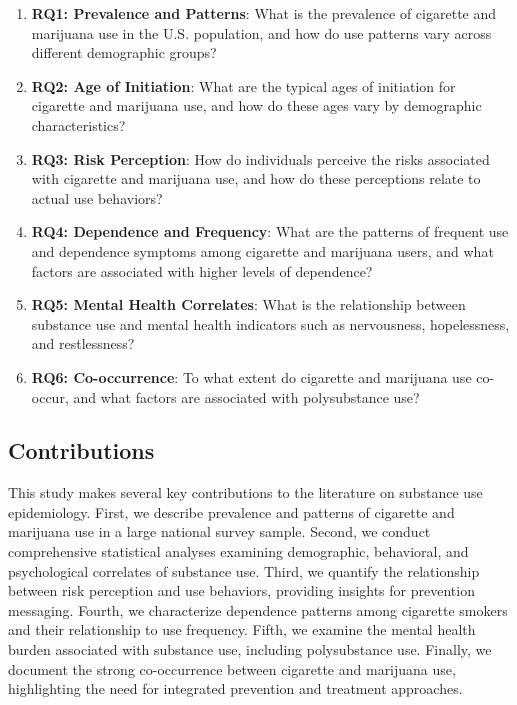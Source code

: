 \documentclass[conference]{IEEEtran}
\begin{document}
\begin{enumerate}
    \item \textbf{RQ1: Prevalence and Patterns}: What is the prevalence of cigarette and marijuana use in the U.S. population, and how do use patterns vary across different demographic groups?
    
    \item \textbf{RQ2: Age of Initiation}: What are the typical ages of initiation for cigarette and marijuana use, and how do these ages vary by demographic characteristics?
    
    \item \textbf{RQ3: Risk Perception}: How do individuals perceive the risks associated with cigarette and marijuana use, and how do these perceptions relate to actual use behaviors?
    
    \item \textbf{RQ4: Dependence and Frequency}: What are the patterns of frequent use and dependence symptoms among cigarette and marijuana users, and what factors are associated with higher levels of dependence?
    
    \item \textbf{RQ5: Mental Health Correlates}: What is the relationship between substance use and mental health indicators such as nervousness, hopelessness, and restlessness?
    
    \item \textbf{RQ6: Co-occurrence}: To what extent do cigarette and marijuana use co-occur, and what factors are associated with polysubstance use?
\end{enumerate}

\subsection{Contributions}

This study makes several key contributions to the literature on substance use epidemiology. First, we describe prevalence and patterns of cigarette and marijuana use in a large national survey sample. Second, we conduct comprehensive statistical analyses examining demographic, behavioral, and psychological correlates of substance use. Third, we quantify the relationship between risk perception and use behaviors, providing insights for prevention messaging. Fourth, we characterize dependence patterns among cigarette smokers and their relationship to use frequency. Fifth, we examine the mental health burden associated with substance use, including polysubstance use. Finally, we document the strong co-occurrence between cigarette and marijuana use, highlighting the need for integrated prevention and treatment approaches.
\end{document}
